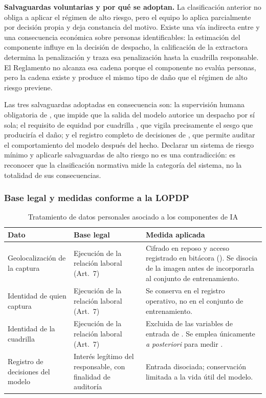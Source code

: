 \noindent
\textbf{Salvaguardas voluntarias y por qué se adoptan.} La clasificación anterior no obliga a aplicar
el régimen de alto riesgo, pero el equipo lo aplica parcialmente por decisión propia y deja
constancia del motivo. Existe una vía indirecta entre  y una consecuencia económica sobre
personas identificables: la estimación del componente influye en la decisión de despacho, la
calificación de la extractora determina la penalización y  traza esa penalización hasta la
cuadrilla responsable. El Reglamento no alcanza esa cadena porque el componente no evalúa personas,
pero la cadena existe y produce el mismo tipo de daño que el régimen de alto riesgo previene.

Las tres salvaguardas adoptadas en consecuencia son: la supervisión humana obligatoria de
, que impide que la salida del modelo autorice un despacho por sí sola; el requisito de
equidad por cuadrilla , que vigila precisamente el sesgo que produciría el daño; y el
registro completo de decisiones de , que permite auditar el comportamiento del modelo
después del hecho. Declarar un sistema de riesgo mínimo y aplicarle salvaguardas de alto riesgo no es
una contradicción: es reconocer que la clasificación normativa mide la categoría del sistema, no la
totalidad de sus consecuencias.

\subsubsection*{Base legal y medidas conforme a la LOPDP}

\begin{table}[H]
\centering\footnotesize
\caption{Tratamiento de datos personales asociado a los componentes de IA}
\label{tab:lopdp-ia}
\begin{tabular}{|L{3.4cm}|L{3.6cm}|L{8.2cm}|}
\hline
{}\textbf{Dato} & \textbf{Base legal} & \textbf{Medida aplicada}\\ \hline
Geolocalización de la captura & Ejecución de la relación laboral (Art.~7) & Cifrado en reposo y acceso registrado en bitácora (). Se disocia de la imagen antes de incorporarla al conjunto de entrenamiento.\\ \hline
Identidad de quien captura & Ejecución de la relación laboral (Art.~7) & Se conserva en el registro operativo, no en el conjunto de entrenamiento.\\ \hline
Identidad de la cuadrilla & Ejecución de la relación laboral (Art.~7) & Excluida de las variables de entrada de . Se emplea únicamente \emph{a posteriori} para medir .\\ \hline
Registro de decisiones del modelo & Interés legítimo del responsable, con finalidad de auditoría & Entrada disociada; conservación limitada a la vida útil del modelo.\\ \hline
\end{tabular}
\end{table}

